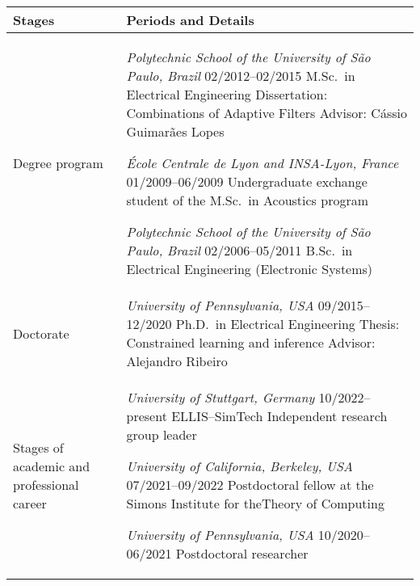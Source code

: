 \documentclass[a4paper,11pt]{article}
\begin{document}
\begin{tabularx}{\textwidth}{|>{\raggedright\arraybackslash}p{2.4cm}|L|}
\hline
\textbf{Stages} & \textbf{Periods and Details}
%
\\\hline


Degree program &
\emph{Polytechnic School of the University of São Paulo, Brazil}
	\hfill 02/2012--02/2015
\newline
M.Sc.\ in Electrical Engineering
\newline
Dissertation: Combinations of Adaptive Filters
\newline
Advisor: C\'{a}ssio Guimar\~{a}es Lopes
\medskip

\emph{École Centrale de Lyon \emph{and} INSA-Lyon, France}
	\hfill 01/2009--06/2009
\newline
Undergraduate exchange student of the\newline
M.Sc.\ in Acoustics program
\medskip

\emph{Polytechnic School of the University of São Paulo, Brazil}
	\hfill 02/2006--05/2011
\newline
B.Sc.\ in Electrical Engineering (Electronic Systems)
%
\\\hline


Doctorate &
\emph{University of Pennsylvania, USA} \hfill 09/2015--12/2020
\newline
Ph.D.\ in Electrical Engineering
\newline
Thesis: Constrained learning and inference
\newline
Advisor: Alejandro Ribeiro
%
\\\hline


Stages of academic and professional career &
\emph{University of Stuttgart, Germany}
	\hfill 10/2022--present
\newline
ELLIS--SimTech Independent research group leader
\medskip

\emph{University of California, Berkeley, USA}
	\hfill 07/2021--09/2022
\newline
Postdoctoral fellow at the Simons Institute for the\newline Theory of Computing
\medskip

\emph{University of Pennsylvania, USA}
	\hfill 10/2020--06/2021
\newline
Postdoctoral researcher
%
\\\hline
\end{tabularx}



\end{document}

